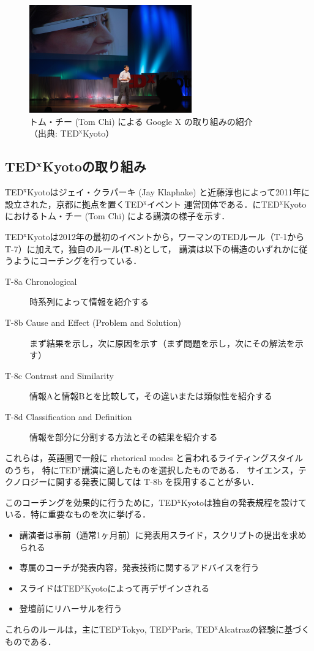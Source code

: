 \documentclass[submit,techreq,jkeyword,noauthor]{ipsj}
\newcommand{\TED}{\textrm{TED}}
\newcommand{\TEDx}{\TED${}^{\textrm{x}}$}
\newcommand{\TEDxTokyo}{\TEDx\textrm{Tokyo}}
\newcommand{\TEDxKyoto}{\TEDx\textrm{Kyoto}}
\newcommand{\TEDxParis}{\TEDx\textrm{Paris}}
\newcommand{\TEDxAlcatraz}{\TEDx\textrm{Alcatraz}}
\newcommand{\TEDtitle}{\textbf{TED}}
\newcommand{\TEDxtitle}{\TEDtitle${}^{\textbf{x}}$}
\newcommand{\TEDxKyototitle}{\TEDxtitle\textbf{Kyoto}}
\begin{document}
\begin{figure}[t]
\begin{center}
\includegraphics[width=7cm,clip]{tom_chi.png}
\end{center}
\caption{トム・チー (Tom Chi) による Google X の取り組みの紹介\\
（出典: \TEDxKyoto ）}
\label{fig:tomchi}
\end{figure}

\subsection{\TEDxKyototitle の取り組み}

\TEDxKyoto はジェイ・クラパーキ (Jay Klaphake) と近藤淳也によって2011年に設立された，京都に拠点を置く\TEDx イベント
運営団体である．に\TEDxKyoto におけるトム・チー (Tom Chi) による講演の様子を示す．

\TEDxKyoto は2012年の最初のイベントから，ワーマンの\TED ルール（T-1からT-7）に加えて，独自のルール\textbf{(T-8)}として，
講演は以下の構造のいずれかに従うようにコーチングを行っている．
\begin{description}
\item[T-8a Chronological] 時系列によって情報を紹介する
\item[T-8b Cause and Effect (Problem and Solution)] まず結果を示し，次に原因を示す（まず問題を示し，次にその解法を示す）
\item[T-8c Contrast and Similarity] 情報Aと情報Bとを比較して，その違いまたは類似性を紹介する
\item[T-8d Classification and Definition] 情報を部分に分割する方法とその結果を紹介する
\end{description}
これらは，英語圏で一般に rhetorical modes と言われるライティングスタイル \cite{cs} のうち，
特に\TEDx 講演に適したものを選択したものである．
サイエンス，テクノロジーに関する発表に関しては T-8b を採用することが多い．

このコーチングを効果的に行うために，\TEDxKyoto は独自の発表規程を設けている．特に重要なものを次に挙げる．
\begin{itemize}
\item 講演者は事前（通常1ヶ月前）に発表用スライド，スクリプトの提出を求められる
\item 専属のコーチが発表内容，発表技術に関するアドバイスを行う
\item スライドは\TEDxKyoto によって再デザインされる
\item 登壇前にリハーサルを行う
\end{itemize}
これらのルールは，主に\TEDxTokyo, \TEDxParis, \TEDxAlcatraz の経験に基づくものである．
\end{document}
